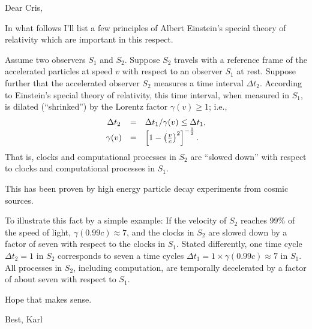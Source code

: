 \documentclass[amsfonts,a4,12pt]{article}
\begin{document}
\pagestyle{plain}


Dear Cris,

In what follows I'll list a few principles
of Albert Einstein's special theory of relativity which are important in this respect.

Assume two observers $S_1$ and $S_2$.
Suppose $S_2$ travels with a reference frame of the accelerated particles at speed $v$
with respect to an observer $S_1$ at rest.
Suppose further that the accelerated observer  $S_2$
measures a time interval $\Delta t_2$.
According to Einstein's special theory of relativity,
this time interval, when measured in $S_1$,  is dilated (``shrinked'')
by  the Lorentz factor $\gamma (v) \ge 1$; i.e.,
\begin{equation}
\begin{array}{ccl}
\Delta t_2 &=& \Delta t_1 / \gamma (v) \le \Delta t_1, \\
\gamma (v) &=& \left[ 1- \left({v\over c}\right)^2\right]^{-{1\over 2}}.
\end{array}
\end{equation}
That is, clocks and computational processes in $S_2$ are ``slowed down'' with respect
to clocks and computational processes in $S_1$.

This has been proven by high energy particle decay experiments from cosmic sources.

To illustrate this fact by a simple example:
If the velocity of $S_2$ reaches 99\% of the speed of light,
$\gamma (0.99c) \approx 7$,
and the clocks in $S_2$ are slowed down by a factor of seven
with respect to the clocks in $S_1$.
Stated differently, one time cycle $\Delta t_2=1$ in $S_2$ corresponds to  seven a time cycles
$\Delta t_1 = 1 \times \gamma (0.99c) \approx 7$ in $S_1$.
All processes in $S_2$, including computation, are temporally decelerated by a factor of about seven
with respect to $S_1$.

Hope that makes sense.

Best,
Karl
\end{document}
